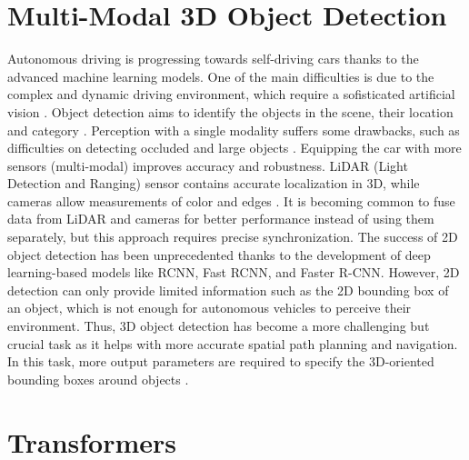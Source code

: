 \section{Multi-Modal 3D Object Detection}
Autonomous driving is progressing towards self-driving cars thanks to the advanced machine learning models. One of the main difficulties is due to the complex and dynamic driving environment, which require a sofisticated artificial vision \cite{wang2021multi}. Object detection aims to identify the objects in the scene, their location and category \cite{wang2021multi}. Perception with a single modality suffers some drawbacks, such as difficulties on detecting occluded and large objects \cite{huang2022multi}\cite{caesar2020nuscenes}. Equipping the car with more sensors (multi-modal) improves accuracy and robustness. LiDAR (Light Detection and Ranging) sensor contains accurate localization in 3D, while cameras allow measurements of color and edges \cite{caesar2020nuscenes}. It is becoming common to fuse data from LiDAR and cameras for better performance instead of using them separately, but this approach requires precise synchronization.
The success of 2D object detection has been unprecedented thanks to the development of deep learning-based models like RCNN, Fast RCNN, and Faster R-CNN. However, 2D detection can only provide limited information such as the 2D bounding box of an object, which is not enough for autonomous vehicles to perceive their environment. Thus, 3D object detection has become a more challenging but crucial task as it helps with more accurate spatial path planning and navigation. In this task, more output parameters are required to specify the 3D-oriented bounding boxes around objects \cite{wang2021multi}.

\section{Transformers}
